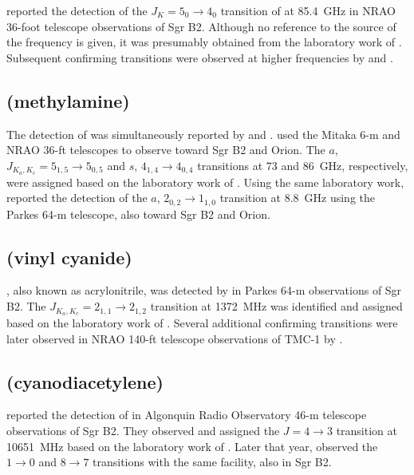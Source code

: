 \documentclass[twocolumn]{aastex631}
\begin{document}
	\citet{Buhl:1973tp} reported the detection of the $J_K = 5_0\rightarrow4_0$ transition of  at 85.4~GHz in NRAO 36-foot telescope observations of Sgr B2.  Although no reference to the source of the frequency is given, it was presumably obtained from the laboratory work of \citet{Trambarulo:1950hi}.  Subsequent confirming transitions were observed at higher frequencies by \citet{Hollis:1981kl} and \citet{Kuiper:1984rp}.
    
    \subsection{ (methylamine)}
	\label{CH3NH2}
	
	The detection of  was simultaneously reported by \citet{Fourikis:1974yx} and \citet{Kaifu:1974nq}.  \citet{Kaifu:1974nq} used the Mitaka 6-m and NRAO 36-ft telescopes to observe  toward Sgr B2 and Orion.  The $a$, $J_{K_a,K_c} = 5_{1,5}\rightarrow5_{0,5}$ and $s$, $4_{1,4}\rightarrow4_{0,4}$ transitions at 73 and 86~GHz, respectively, were assigned based on the laboratory work of \citet{Takagi:1973kq}.  Using the same laboratory work, \citet{Fourikis:1974yx} reported the detection of the $a$, $2_{0,2}\rightarrow1_{1,0}$ transition at 8.8~GHz using the Parkes 64-m telescope, also toward Sgr B2 and Orion.
	
	\subsection{ (vinyl cyanide)}
	\label{CH2CHCN}
	
	, also known as acrylonitrile, was detected by \citet{Gardner:1975ef} in Parkes 64-m observations of Sgr B2.  The $J_{K_a,K_c} = 2_{1,1}\rightarrow2_{1,2}$ transition at 1372~MHz was identified and assigned based on the laboratory work of \citet{Gerry:1973ju}.  Several additional confirming transitions were later observed in NRAO 140-ft telescope observations of TMC-1 by \citet{Matthews:1983df}.
	
	\subsection{ (cyanodiacetylene)}
	\label{HC5N}
	
	\citet{Avery:1976eq} reported the detection of  in Algonquin Radio Observatory 46-m telescope observations of Sgr B2.  They observed and assigned the $J = 4\rightarrow3$ transition at 10651~MHz based on the laboratory work of \citet{Alexander:1976ed}.  Later that year, \citet{Broten:1976do} observed the $1\rightarrow0$ and $8\rightarrow7$ transitions with the same facility, also in Sgr B2.
	
\end{document}
